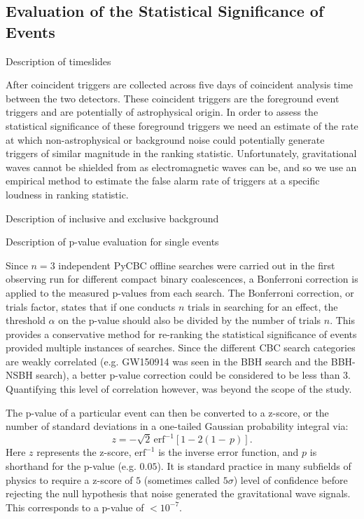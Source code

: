 \subsection{Evaluation of the Statistical Significance of Events}
Description of timeslides

After coincident triggers are collected across five days of coincident analysis time between the two detectors. These coincident triggers are the foreground event triggers and are potentially of astrophysical origin. In order to assess the statistical significance of these foreground triggers we need an estimate of the rate at which non-astrophysical or background noise could potentially generate triggers of similar magnitude in the ranking statistic. Unfortunately, gravitational waves cannot be shielded from as electromagnetic waves can be, and so we use an empirical method to estimate the false alarm rate of triggers at a specific loudness in ranking statistic.

Description of inclusive and exclusive background

Description of p-value evaluation for single events

Since $n=3$ independent PyCBC offline searches were carried out in the first observing run for different compact binary coalescences, a Bonferroni correction is applied to the measured p-values from each search. The Bonferroni correction, or trials factor, states that if one conducts $n$ trials in searching for an effect, the threshold $\alpha$ on the p-value should also be divided by the number of trials $n$. This provides a conservative method for re-ranking the statistical significance of events provided multiple instances of searches. Since the different CBC search categories are weakly correlated (e.g. GW150914 was seen in the BBH search and the BBH-NSBH search), a better p-value correction could be considered to be less than $3$. Quantifying this level of correlation however, was beyond the scope of the study.

The p-value of a particular event can then be converted to a z-score, or the number of standard deviations in a one-tailed Gaussian probability integral via: 
\begin{equation}
    z = - \sqrt{2} \, \mathrm{erf}^{-1} \left[1 -  2 \left(1-\, p\right)\right].
\end{equation}
Here $z$ represents the z-score, $\mathrm{erf}^{-1}$ is the inverse error function, and $p$ is shorthand for the p-value (e.g. $0.05$). It is standard practice in many subfields of physics to require a z-score of $5$ (sometimes called $5 \sigma$) level of confidence before rejecting the null hypothesis that noise generated the gravitational wave signals. This corresponds to a p-value of $< 10^{-7}$.

